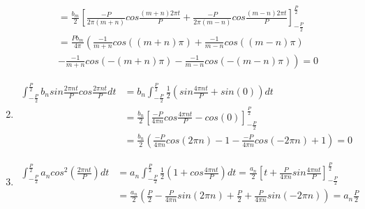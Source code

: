 \documentclass[titlepage]{article}
\begin{document}
\begin{enumerate}
\begin{equation*}
\begin{split}
                & = \frac{b_m}{2} \left[\frac{-P}{2\pi(m+n)}cos\frac{(m+n)2\pi t}{P}
                + \frac{-P}{2\pi(m-n)}cos\frac{(m-n)2\pi t}{P}
                \right]_{-\frac{P}{2}}^{\frac{P}{2}} \\ %
                & = \frac{Pb_m}{4\pi} \left( \frac{-1}{m+n}cos((m+n)\pi)
                + \frac{-1}{m-n} cos((m-n)\pi) \right. \\
                & \left. - \frac{-1}{m+n} cos(-(m+n)\pi) - \frac{-1}{m-n} 
                cos(-(m-n)\pi) \right) = 0
            \end{split}
            \end{equation*}
        \item 
            \begin{equation*}
            \begin{split}
                \int_{-\frac{P}{2}}^{\frac{P}{2}} b_nsin \frac{2\pi nt}{P} 
                cos\frac{2\pi nt}{P}dt %
                & = b_n \int_{-\frac{P}{2}}^{\frac{P}{2}} \frac{1}{2} \left(
                sin\frac{4\pi nt}{P} + sin(0) \right) dt \\ %
                & = \frac{b_n}{2} \left[ \frac{-P}{4\pi n}cos\frac{4\pi nt}{P}
                - cos(0) \right]_{-\frac{P}{2}}^{\frac{P}{2}} \\ %
                & = \frac{b_n}{2} \left( \frac{-P}{4\pi n}cos(2\pi n) - 1 
                - \frac{-P}{4\pi n}cos(-2\pi n) + 1 \right) = 0
            \end{split}
            \end{equation*}
        \item
            \begin{equation*}
            \begin{split}
                \int_{-\frac{P}{2}}^{\frac{P}{2}}a_n cos^2(\frac{2\pi nt}{P})dt
                & = a_n\int_{-\frac{P}{2}}^{\frac{P}{2}}
                \frac{1}{2}\left(1 + cos\frac{4\pi nt}{P} \right)dt 
                = \frac{a_n}{2} \left[t + \frac{P}{4\pi n}sin\frac{4\pi nt}{P}
                \right]_{-\frac{P}{2}}^{\frac{P}{2}} \\
                & = \frac{a_n}{2}\left( \frac{P}{2} - \frac{P}{4\pi n}sin(2\pi n) + 
                \frac{P}{2} + \frac{P}{4\pi n}sin(-2\pi n)\right) = a_n\frac{P}{2}
            \end{split}
            \end{equation*}
    \end{enumerate}
\end{document}
